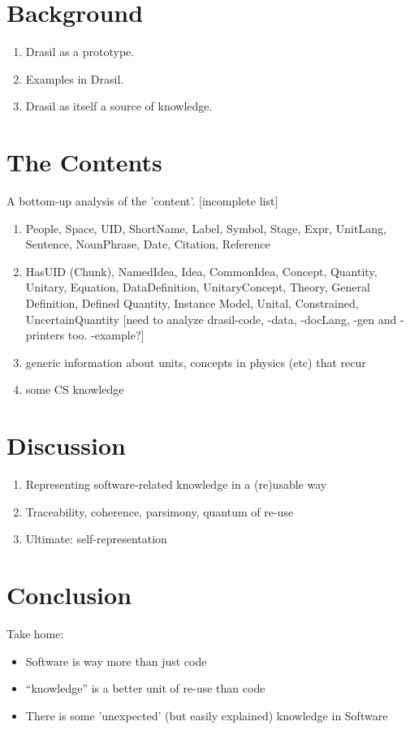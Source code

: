 \documentclass[10pt,conference]{IEEEtran}
\begin{document}
\section{Background}
\begin{enumerate}
  \item Drasil as a prototype.
  \item Examples in Drasil.
  \item Drasil as itself a source of knowledge. 
\end{enumerate}

\section{The Contents}
  A bottom-up analysis of the 'content'. [incomplete list]
  \begin{enumerate}
  \item People, Space, UID, ShortName, Label, Symbol, Stage, Expr, UnitLang, Sentence, NounPhrase, Date, Citation, Reference
  \item HasUID (Chunk), NamedIdea, Idea, CommonIdea, Concept, Quantity, Unitary, Equation, DataDefinition, UnitaryConcept,
    Theory, General Definition, Defined Quantity, Instance Model, Unital, Constrained, UncertainQuantity
  [need to analyze drasil-code, -data, -docLang, -gen and -printers too. -example?]
  \item generic information about units, concepts in physics (etc) that recur
  \item some CS knowledge 
  \end{enumerate}

\section{Discussion}
\begin{enumerate}
  \item Representing software-related knowledge in a (re)usable way
  \item Traceability, coherence, parsimony, quantum of re-use
  \item Ultimate: self-representation 
\end{enumerate}

\section{Conclusion}

Take home:
\begin{itemize}
\item Software is way more than just code
\item ``knowledge'' is a better unit of re-use than code
\item There is some 'unexpected' (but easily explained) knowledge in Software 
\end{itemize}



\end{document}
